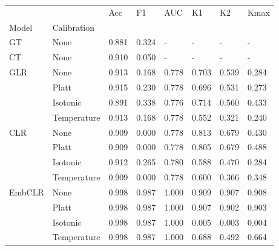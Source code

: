 \begin{tabular}{llllllll}
\toprule
 &  & Acc & F1 & AUC & K1 & K2 & Kmax \\
Model & Calibration &  &  &  &  &  &  \\
\midrule
GT & None & 0.881 & 0.324 & - & - & - & - \\
\cline{1-8}
CT & None & 0.910 & 0.050 & - & - & - & - \\
\cline{1-8}
\multirow[t]{4}{*}{GLR} & None & 0.913 & 0.168 & 0.778 & 0.703 & 0.539 & 0.284 \\
 & Platt & 0.915 & 0.230 & 0.778 & 0.696 & 0.531 & 0.273 \\
 & Isotonic & 0.891 & 0.338 & 0.776 & 0.714 & 0.560 & 0.433 \\
 & Temperature & 0.913 & 0.168 & 0.778 & 0.552 & 0.321 & 0.240 \\
\cline{1-8}
\multirow[t]{4}{*}{CLR} & None & 0.909 & 0.000 & 0.778 & 0.813 & 0.679 & 0.430 \\
 & Platt & 0.909 & 0.000 & 0.778 & 0.805 & 0.679 & 0.488 \\
 & Isotonic & 0.912 & 0.265 & 0.780 & 0.588 & 0.470 & 0.284 \\
 & Temperature & 0.909 & 0.000 & 0.778 & 0.600 & 0.366 & 0.348 \\
\cline{1-8}
\multirow[t]{4}{*}{EmbCLR} & None & 0.998 & 0.987 & 1.000 & 0.909 & 0.907 & 0.908 \\
 & Platt & 0.998 & 0.987 & 1.000 & 0.907 & 0.902 & 0.903 \\
 & Isotonic & 0.998 & 0.987 & 1.000 & 0.005 & 0.003 & 0.004 \\
 & Temperature & 0.998 & 0.987 & 1.000 & 0.688 & 0.492 & 0.664 \\
\cline{1-8}
\bottomrule
\end{tabular}
